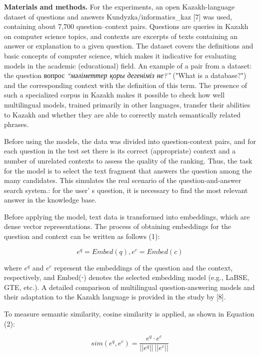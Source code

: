 \begin{multicols}{2}
{\bfseries Materials and methods.} For the experiments, an open
Kazakh-language dataset of questions and answers
Kundyzka/informatics\_kaz {[}7{]} was used, containing about 7,700
question--context pairs. Questions are queries in Kazakh on computer
science topics, and contexts are excerpts of texts containing an answer
or explanation to a given question. The dataset covers the definitions
and basic concepts of computer science, which makes it indicative for
evaluating models in the academic (educational) field. An example of a
pair from a dataset: the question вопрос \emph{``мәліметтер қоры
дегеніміз не?''} ("What is a database?") and the corresponding context
with the definition of this term. The presence of such a specialized
corpus in Kazakh makes it possible to check how well multilingual
models, trained primarily in other languages, transfer their abilities
to Kazakh and whether they are able to correctly match semantically
related phrases.

Before using the models, the data was divided into question-context
pairs, and for each question in the test set there is its correct
(appropriate) context and a number of unrelated contexts to assess the
quality of the ranking. Thus, the task for the model is to select the
text fragment that answers the question among the many candidates. This
simulates the real scenario of the question-and-answer search system.:
for the user' s question, it is necessary to find the
most relevant answer in the knowledge base.

Before applying the model, text data is transformed into embeddings,
which are dense vector representations. The process of obtaining
embeddings for the question and context can be written as follows (1):

\begin{equation}
e^{q} = Embed(q), e^{c} = Embed(c)
\end{equation}

where \(e^{q}\) and \(e^{c}\) represent the embeddings of the question
and the context, respectively, and Embed(⋅) denotes the selected
embedding model (e.g., LaBSE, GTE, etc.). A detailed comparison of
multilingual question-answering models and their adaptation to the
Kazakh language is provided in the study by {[}8{]}.

To measure semantic similarity, cosine similarity is applied, as shown
in Equation (2):

\begin{equation}
sim(e^{q}, e^{c})=\frac{e^{q} \cdot e^{c}}{||e^{q}||\ ||e^{c}||}
\end{equation}


\end{multicols}
